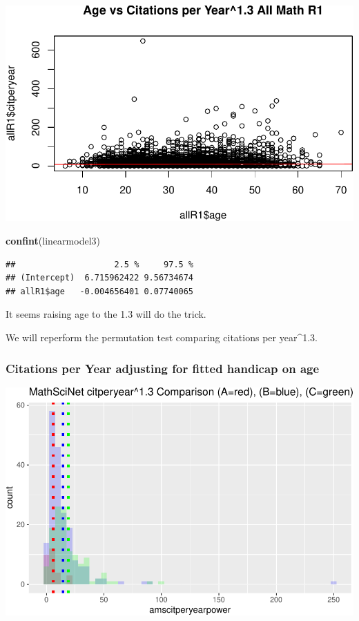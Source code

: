 \documentclass[]{article}
\newenvironment{Shaded}{\begin{snugshade}}{\end{snugshade}}
\newcommand{\KeywordTok}[1]{\textcolor[rgb]{0.13,0.29,0.53}{\textbf{#1}}}
\newcommand{\NormalTok}[1]{#1}
\begin{document}
\includegraphics{index_files/figure-latex/unnamed-chunk-30-1.pdf}

\begin{Shaded}
\begin{Highlighting}[]
\KeywordTok{confint}\NormalTok{(linearmodel3)}
\end{Highlighting}
\end{Shaded}

\begin{verbatim}
##                    2.5 %     97.5 %
## (Intercept)  6.715962422 9.56734674
## allR1$age   -0.004656401 0.07740065
\end{verbatim}

It seems raising age to the 1.3 will do the trick.

We will reperform the permutation test comparing citations per
year\^{}1.3.

\hypertarget{citations-per-year-adjusting-for-fitted-handicap-on-age}{%
\subsubsection{Citations per Year adjusting for fitted handicap on
age}\label{citations-per-year-adjusting-for-fitted-handicap-on-age}}

\includegraphics{index_files/figure-latex/unnamed-chunk-32-1.pdf}
\end{document}
